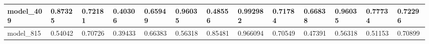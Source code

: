 \begin{tabular}{|l|l|l|l|l|l|l|l|l|l|l|l|l|}
model\_409     & 0.87325     & 0.72181        & 0.40306      & 0.65949          & 0.96035              & 0.48556              & 0.992982     & 0.71784           & 0.66838            & 0.96035         & 0.77734     & 0.72296      \\ \hline
model\_815     & 0.54042     & 0.70726        & 0.39433      & 0.66383          & 0.56318              & 0.85481              & 0.966094     & 0.70549           & 0.47391            & 0.56318         & 0.51153     & 0.70899      \\ \hline
\end{tabular}